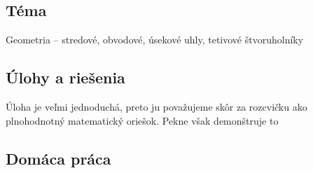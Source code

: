 
\subsection*{Téma}
Geometria -- stredové, obvodové, úsekové uhly, tetivové štvoruholníky


\subsection*{Úlohy a riešenia}



\kom Úloha je veľmi jednoduchá, preto ju považujeme skôr za rozcvičku ako plnohodnotný matematický oriešok. Pekne však demonštruje to 










\subsection*{Domáca práca}


